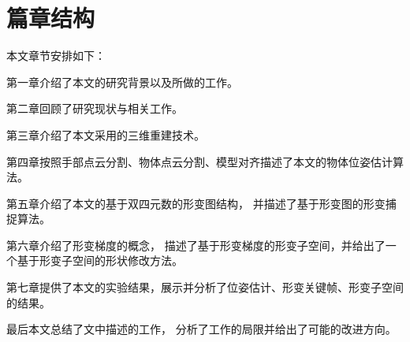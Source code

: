 \section{篇章结构}
本文章节安排如下：

第一章介绍了本文的研究背景以及所做的工作。

第二章回顾了研究现状与相关工作。

第三章介绍了本文采用的三维重建技术。

第四章按照手部点云分割、物体点云分割、模型对齐描述了本文的物体位姿估计算法。

第五章介绍了本文的基于双四元数的形变图结构，
并描述了基于形变图的形变捕捉算法。

第六章介绍了形变梯度的概念，
描述了基于形变梯度的形变子空间，并给出了一个基于形变子空间的形状修改方法。

第七章提供了本文的实验结果，展示并分析了位姿估计、形变关键帧、形变子空间的结果。

最后本文总结了文中描述的工作，
分析了工作的局限并给出了可能的改进方向。